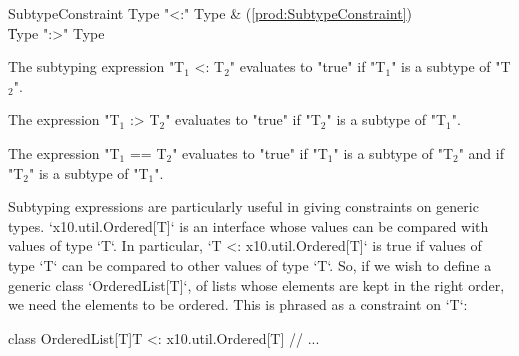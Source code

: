 \begin{bbgrammar}
   SubtypeConstraint \: Type  \xcd"<:" Type  & (\ref{prod:SubtypeConstraint}) \\
                     \| Type  \xcd":>" Type  \\
\end{bbgrammar}

The subtyping expression \xcdmath"T$_1$ <: T$_2$" evaluates to \xcd"true" if
\xcdmath"T$_1$" is a subtype of \xcdmath"T$_2$".

The expression \xcdmath"T$_1$ :> T$_2$" evaluates to \xcd"true" if
\xcdmath"T$_2$" is a subtype of \xcdmath"T$_1$".

The expression \xcdmath"T$_1$ == T$_2$"
evaluates to  \xcd"true" if 
\xcdmath"T$_1$" is a subtype of \xcdmath"T$_2$" and
if \xcdmath"T$_2$" is a subtype of \xcdmath"T$_1$".

\begin{ex}
Subtyping expressions are particularly useful in giving constraints on generic
types.  \xcd`x10.util.Ordered[T]` is an interface whose values can be compared
with values of type \xcd`T`. 
In particular, \xcd`T <: x10.util.Ordered[T]` is
true if values of type \xcd`T` can be compared to other values of type
\xcd`T`.  So, if we wish to define a generic class \xcd`OrderedList[T]`, of
lists whose elements are kept in the right order, we need the elements to be
ordered.  This is phrased as a constraint on \xcd`T`: 
\begin{xten}
class OrderedList[T]{T <: x10.util.Ordered[T]} {
  // ...
}
\end{xten}
%
\end{ex}



